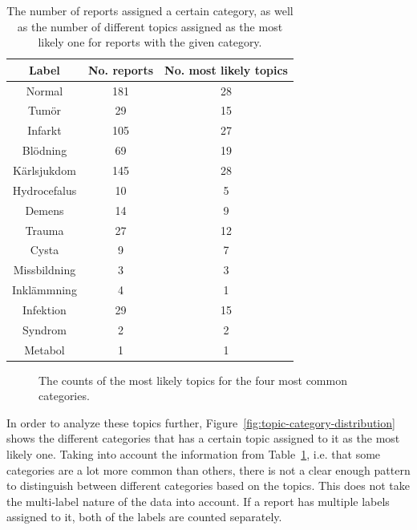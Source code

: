 \begin{table}[ht!]
    \centering
    \begin{tabular}{|c|cc|}
        \hline
        \textbf{Label} & \textbf{No. reports} & \textbf{No. most likely topics} \\
        \hline
        Normal & 181 & 28\\
        Tumör & 29 & 15\\
        Infarkt & 105 & 27\\
        Blödning & 69 & 19\\
        Kärlsjukdom & 145 & 28\\
        Hydrocefalus & 10 & 5\\
        Demens & 14 & 9\\
        Trauma & 27 & 12\\
        Cysta & 9 & 7\\
        Missbildning & 3 & 3\\
        Inklämmning & 4 & 1\\
        Infektion & 29 & 15\\
        Syndrom & 2 & 2\\
        Metabol & 1 & 1\\
        \hline
    \end{tabular}
    \caption{The number of reports assigned a certain category, as well as the number of different topics assigned as the most likely one for reports with the given category.}
    \label{tab:topic-categories}
\end{table}

\begin{figure}[h!]
    \centering
    \quad
    \caption{The counts of the most likely topics for the four most common categories.}
    \label{fig:category-label-distribution}
\end{figure}

In order to analyze these topics further, Figure~\ref{fig:topic-category-distribution} shows the different categories that has a certain topic assigned to it as the most likely one.
Taking into account the information from Table~\ref{tab:topic-categories}, i.e. that some categories are a lot more common than others, there is not a clear enough pattern to distinguish between different categories based on the topics.
This does not take the multi-label nature of the data into account.
If a report has multiple labels assigned to it, both of the labels are counted separately.

